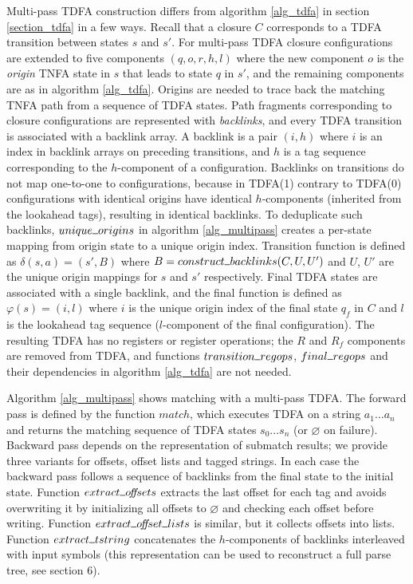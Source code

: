 \documentclass[]{article}
\newcommand{\Xund}{\rule{.5em}{.5pt}}
\begin{document}
Multi-pass TDFA construction differs from algorithm \ref{alg_tdfa} in section \ref{section_tdfa} in a few ways.
Recall that a closure $C$ corresponds to a TDFA transition between states $s$ and $s'$.
For multi-pass TDFA closure configurations are extended to five components $(q, o, r, h, l)$
where the new component $o$ is the \emph{origin} TNFA state in $s$ that leads to state $q$ in $s'$,
and the remaining components are as in algorithm \ref{alg_tdfa}.
Origins are needed to trace back the matching TNFA path from a sequence of TDFA states.
%
Path fragments corresponding to closure configurations are represented with \emph{backlinks},
and every TDFA transition is associated with a backlink array.
A backlink is a pair $(i, h)$ where $i$ is an index in backlink arrays on preceding transitions,
and $h$ is a tag sequence corresponding to the $h$-component of a configuration.
%
Backlinks on transitions do not map one-to-one to configurations,
because in TDFA(1) contrary to TDFA(0) configurations with identical origins have identical $h$-components (inherited from the lookahead tags),
resulting in identical backlinks.
%
To deduplicate such backlinks, $unique \Xund origins$ in algorithm \ref{alg_multipass}
creates a per-state mapping from origin state to a unique origin index.
%
Transition function is defined as $\delta(s, a) = (s', B)$ where $B = construct \Xund backlinks (C, U, U')$
and $U$, $U'$ are the unique origin mappings for $s$ and $s'$ respectively.
%
Final TDFA states are associated with a single backlink,
and the final function is defined as $\varphi(s) = (i, l)$
where $i$ is the unique origin index of the final state $q_f$ in $C$
and $l$ is the lookahead tag sequence ($l$-component of the final configuration).
%
The resulting TDFA has no registers or register operations;
the $R$ and $R_f$ components are removed from TDFA, and
functions $transition \Xund regops$, $final \Xund regops$ and their dependencies in algorithm \ref{alg_tdfa} are not needed.
%
\medskip

Algorithm \ref{alg_multipass} shows matching with a multi-pass TDFA.
The forward pass is defined by the function $match$,
which executes TDFA on a string $a_1 \hdots a_n$ and returns the matching sequence of TDFA states $s_0 \hdots s_n$ (or $\varnothing$ on failure).
Backward pass depends on the representation of submatch results;
we provide three variants for offsets, offset lists and tagged strings.
In each case the backward pass follows a sequence of backlinks from the final state to the initial state.
Function $extract \Xund o\!f\!\!f\!sets$ extracts the last offset for each tag
and avoids overwriting it by initializing all offsets to $\varnothing$ and checking each offset before writing.
Function $extract \Xund o\!f\!\!f\!set \Xund lists$ is similar, but it collects offsets into lists.
Function $extract \Xund tstring$ concatenates the $h$-components of backlinks interleaved with input symbols
(this representation can be used to reconstruct a full parse tree, see \cite{BorTro19} section 6).
\medskip
\end{document}
